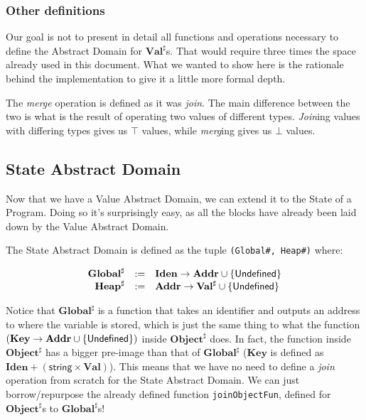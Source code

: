 \subsubsection*{Other definitions}

Our goal is not to present in detail all functions and operations necessary to define the
Abstract Domain for \(\mathbf{Val}^\sharp\)s. That would require three times the space
already used in this document. What we wanted to show here is the rationale behind the
implementation to give it a little more formal depth.

The \emph{merge} operation is defined as it was \emph{join}. The main difference between
the two is what is the result of operating two values of different types. \emph{Join}ing
values with differing types gives us \(\top\) values, while \emph{merg}ing gives us
\(\bot\) values.

\subsection{State Abstract Domain}\label{state-abstract-domain-1}

Now that we have a Value Abstract Domain, we can extend it to the State
of a Program. Doing so it's surprisingly easy, as all the blocks have
already been laid down by the Value Abstract Domain.

The State Abstract Domain is defined as the tuple
\texttt{(Global\#,\ Heap\#)} where:

\vspace*{-1em}
\[\begin{array}{rcl}
  \mathbf{Global}^\sharp  &:=& \mathbf{Iden} \to \mathbf{Addr} \cup \{\mathsf{Undefined}\} \\
  \mathbf{Heap}^\sharp  &:=& \mathbf{Addr} \to \mathbf{Val}^\sharp \cup \{\mathsf{Undefined}\} \\
\end{array}\]


Notice that \(\mathbf{Global}^\sharp\) is a function that takes an identifier and outputs
an address to where the variable is stored, which is just the same thing to what the function
\(\left(\mathbf{Key} \to \mathbf{Addr} \cup \{\mathsf{Undefined}\}\right)\) inside
\(\mathbf{Object}^\sharp\) does. In fact, the function inside \(\mathbf{Object}^\sharp\)
has a bigger pre-image than that of \(\mathbf{Global}^\sharp\) (\(\mathbf{Key}\) is
defined as \(\mathbf{Iden} + \left(\textsf{string} \times \mathbf{Val}\right)\)). This
means that we have no need to define a \emph{join} operation from scratch for the State
Abstract Domain. We can just borrow/repurpose the already defined function
\texttt{joinObjectFun}, defined for \(\mathbf{Object}^\sharp\)s to
\(\mathbf{Global}^\sharp\)s!

